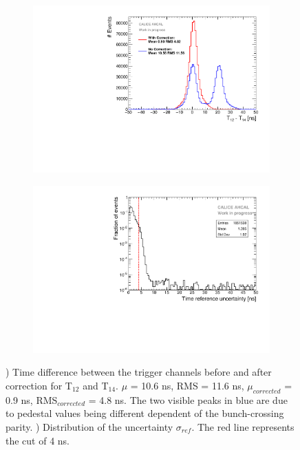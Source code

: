 \documentclass{JINST}
\begin{document}
\begin{figure}[htbp!]
	\begin{subfigure}[t]{0.49\textwidth}
		\centering
		\includegraphics[width=1\linewidth]{fig/T0_Resolution_5.pdf}
		\caption{} \label{fig:T0Corr}
	\end{subfigure}
	\hfill
	\begin{subfigure}[t]{0.49\textwidth}
		\centering
		\includegraphics[width=1\linewidth]{fig/T0ReferenceError.pdf}
		\caption{} \label{fig:TRefErr}
	\end{subfigure}
	\caption{) Time difference between the trigger channels before and after correction for T$_{12}$ and T$_{14}$. $\mu$ = 10.6 ns, RMS = 11.6 ns, $\mu_{corrected}$ = 0.9 ns, RMS$_{corrected}$ = 4.8 ns. The two visible peaks in blue are due to pedestal values being different dependent of the bunch-crossing parity. ) Distribution of the uncertainty $\sigma_{ref}$. The red line represents the cut of 4 ns.}
\end{figure}
\end{document}
